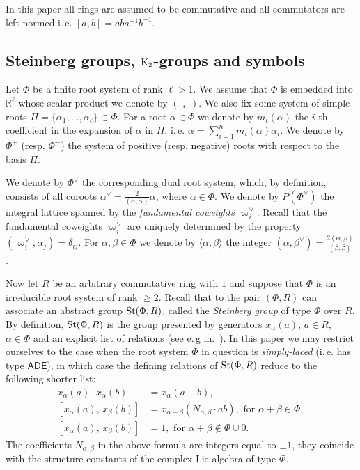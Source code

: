 In this paper all rings are assumed to be commutative and all commutators are left-normed i.\,e. $[a, b] = a b a^{-1} b^{-1}$.

\subsection{Steinberg groups, $\operatorname{K}_2$-groups and symbols}\label{subsec:steinberg-preliminaries}
Let $\Phi$ be a finite root system of rank $\ell > 1$.
We assume that $\Phi$ is embedded into $\mathbb{R}^\ell$ whose scalar product we denote by $(\text{-}, \text{-})$.
We also fix some system of simple roots $\Pi = \{\alpha_1, \ldots, \alpha_\ell\} \subset \Phi$.
For a root $\alpha\in\Phi$ we denote by $m_i(\alpha)$ the $i$-th coefficient in the expansion of $\alpha$ in $\Pi$,
i.\,e. $\alpha = \sum_{i=1}^n m_i(\alpha) \alpha_i$.
We denote by $\Phi^+$ (resp. $\Phi^-$) the system of positive (resp. negative) roots with respect to the basis $\Pi$.

We denote by $\Phi^\vee$ the corresponding dual root system, which, by definition, consists of all coroots $\alpha^\vee = \frac{2}{(\alpha, \alpha)} \alpha$, where $\alpha \in \Phi$.
We denote by $P(\Phi^\vee)$ the integral lattice spanned by the \emph{fundamental coweights $\varpi_i^\vee$}.
Recall that the fundamental coweights $\varpi_i^\vee$ are uniquely determined by the property $(\varpi_i^\vee, \alpha_j) = \delta_{ij}$.
For $\alpha,\beta \in \Phi$ we denote by $\langle \alpha, \beta \rangle$ the integer $(\alpha, \beta^\vee) = \frac{2(\alpha, \beta)}{(\beta, \beta)}$.

Now let $R$ be an arbitrary commutative ring with $1$ and suppose that $\Phi$ is an irreducible root system of rank $\geq 2$.
Recall that to the pair $(\Phi, R)$ can associate an abstract group $\operatorname{St}(\Phi, R)$, called the \textit{Steinberg group} of type $\Phi$ over $R$.
By definition, $\operatorname{St}(\Phi, R)$ is the group presented by generators $x_\alpha(a)$, $a \in R$, $\alpha \in \Phi$ and an explicit list of relations (see e.\,g in.~\cite{Ma69, Re75, St71}).
In this paper we may restrict ourselves to the case when the root system $\Phi$ in question is \textit{simply-laced} (i.\,e. has type $\mathsf{ADE}$),
 in which case the defining relations of $\operatorname{St}(\Phi, R)$ reduce to the following shorter list:
\begin{align}
x_{\alpha}(a)\cdot x_{\alpha}(b)&=x_{\alpha}(a+b), \tag{R1} \label{x-additivity}\\
[x_{\alpha}(a),\,x_{\beta}(b)]  &=x_{\alpha+\beta}(N_{\alpha,\beta} \cdot ab),\text{ for }\alpha+\beta\in\Phi, \tag{R2} \label{R2} \\
[x_{\alpha}(a),\,x_{\beta}(b)]  &=1,\text{ for }\alpha+\beta\not\in\Phi\cup0. \tag{R3} \label{R3}
\end{align}
The coefficients $N_{\alpha,\beta}$ in the above formula are integers equal to $\pm 1$, they coincide with the structure constants of the complex Lie algebra of type $\Phi$.

